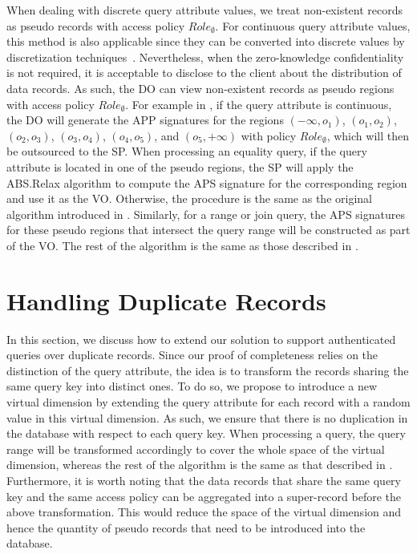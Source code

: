 When dealing with discrete query attribute values, we treat non-existent records as pseudo records with access policy ${Role}_{\emptyset}$. For continuous query attribute values, this method is also applicable since they can be converted into discrete values by discretization techniques~\cite{Kotsiantis2006}. Nevertheless, when the zero-knowledge confidentiality is not required, it is acceptable to disclose to the client about the distribution of data records. As such, the DO can view non-existent records as pseudo regions with access policy ${Role}_{\emptyset}$. For example in , if the query attribute is continuous, the DO will generate the APP signatures for the regions $(-\infty,o_1)$, $(o_1, o_2)$, $(o_2, o_3)$, $(o_3, o_4)$, $(o_4, o_5)$, and $(o_5, +\infty)$ with policy ${Role}_{\emptyset}$, which will then be outsourced to the SP\@. When processing an equality query, if the query attribute is located in one of the pseudo regions, the SP will apply the \textsf{ABS.Relax} algorithm to compute the APS signature for the corresponding region and use it as the VO\@. Otherwise, the procedure is the same as the original algorithm introduced in . Similarly, for a range or join query, the APS signatures for these pseudo regions that intersect the query range will be constructed as part of the VO\@. The rest of the algorithm is the same as those described in .

\section{Handling Duplicate Records}\label{sec:access-control:dup}

In this section, we discuss how to extend our solution to support authenticated queries over duplicate records. Since our proof of completeness relies on the distinction of the query attribute, the idea is to transform the records sharing the same query key into distinct ones. To do so, we propose to introduce a new virtual dimension by extending the query attribute for each record with a random value in this virtual dimension. As such, we ensure that there is no duplication in the database with respect to each query key.
When processing a query, the query range will be transformed accordingly to cover the whole space of the virtual dimension, whereas the rest of the algorithm is the same as that described in .
Furthermore, it is worth noting that the data records that share the same query key and the same access policy can be aggregated into a super-record before the above transformation. This would reduce the space of the virtual dimension and hence the quantity of pseudo records that need to be introduced into the database.

